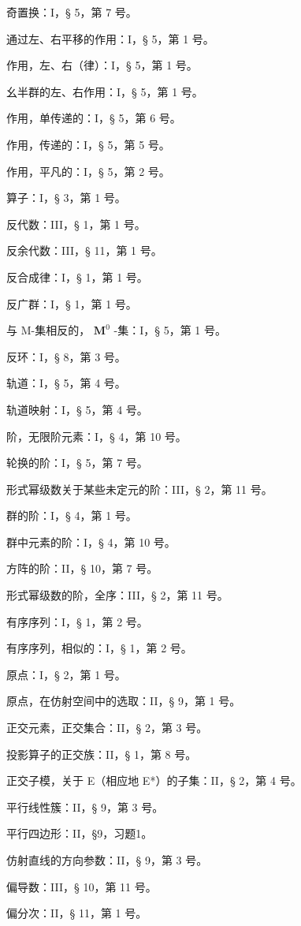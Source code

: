奇置换：I，§ 5，第 7 号。

通过左、右平移的作用：I，§ 5，第 1 号。

作用，左、右（律）：I，§ 5，第 1 号。

幺半群的左、右作用：I，§ 5，第 1 号。

作用，单传递的：I，§ 5，第 6 号。

作用，传递的：I，§ 5，第 5 号。

作用，平凡的：I，§ 5，第 2 号。

算子：I，§ 3，第 1 号。

反代数：III，§ 1，第 1 号。

反余代数：III，§ 11，第 1 号。

反合成律：I，§ 1，第 1 号。

反广群：I，§ 1，第 1 号。

与 M-集相反的， \(\mathbf{M}^0\) -集：I，§ 5，第 1 号。

反环：I，§ 8，第 3 号。

轨道：I，§ 5，第 4 号。

轨道映射：I，§ 5，第 4 号。

阶，无限阶元素：I，§ 4，第 10 号。

轮换的阶：I，§ 5，第 7 号。

形式幂级数关于某些未定元的阶：III，§ 2，第 11 号。

群的阶：I，§ 4，第 1 号。

群中元素的阶：I，§ 4，第 10 号。

方阵的阶：II，§ 10，第 7 号。

形式幂级数的阶，全序：III，§ 2，第 11 号。

有序序列：I，§ 1，第 2 号。

有序序列，相似的：I，§ 1，第 2 号。

原点：I，§ 2，第 1 号。

原点，在仿射空间中的选取：II，§ 9，第 1 号。

正交元素，正交集合：II，§ 2，第 3 号。

投影算子的正交族：II，§ 1，第 8 号。

正交子模，关于 E（相应地 E*）的子集：II，§ 2，第 4 号。

平行线性簇：II，§ 9，第 3 号。

平行四边形：II，§9，习题1。

仿射直线的方向参数：II，§ 9，第 3 号。

偏导数：III，§ 10，第 11 号。

偏分次：II，§ 11，第 1 号。

